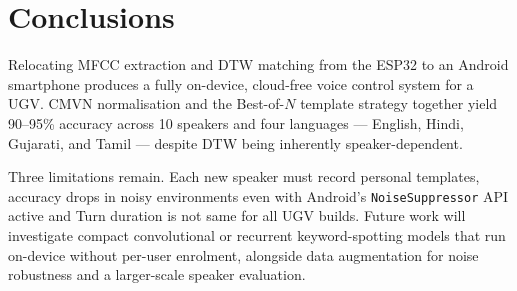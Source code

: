 \documentclass[conference]{IEEEtran}
\begin{document}
	\section{Conclusions} \label{sec:conclusions}
	
	Relocating MFCC extraction and DTW matching from the ESP32 to an
	Android smartphone produces a fully on-device, cloud-free voice
	control system for a UGV. 
	CMVN normalisation and the Best-of-$N$ template strategy together
	yield 90--95\% accuracy across 10 speakers and four languages
	— English, Hindi, Gujarati, and Tamil — despite DTW being
	inherently speaker-dependent.
	
	Three limitations remain. Each new speaker must record personal
	templates, accuracy drops in noisy environments even with
	Android's \texttt{NoiseSuppressor} API active and Turn duration is not same for all UGV builds. Future work will
	investigate compact convolutional or recurrent keyword-spotting
	models that run on-device without per-user enrolment, alongside
	data augmentation for noise robustness and a larger-scale
	speaker evaluation.
	
	\nocite{*}
	
	
	
	
	
	
	
	
\end{document}

